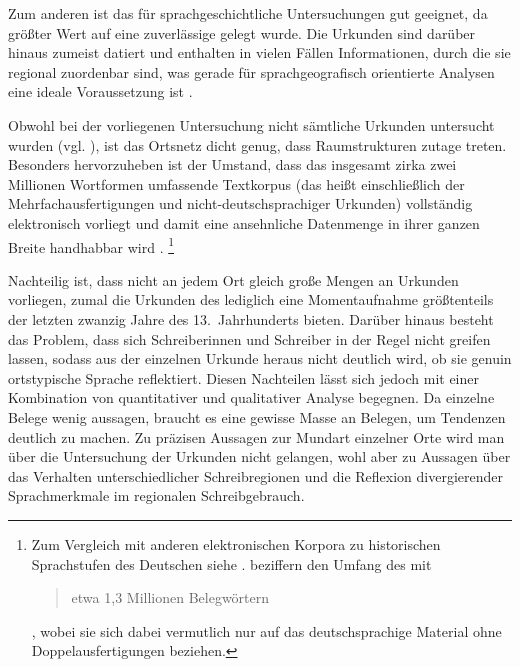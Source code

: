 Zum anderen ist das \CAO{} für sprachgeschichtliche
Untersuchungen gut geeignet, da größter Wert auf eine zuverlässige
 gelegt wurde. Die Urkunden sind darüber hinaus zumeist
datiert und enthalten in vielen Fällen Informationen, durch die sie regional
zuordenbar sind, was gerade für sprachgeografisch
orientierte Analysen eine ideale Voraussetzung ist
\autocites[7--8]{wmuovz}[Schreibortverzeichnis]{cao-online}[22]{schulze2011}.

Obwohl bei der vorliegenen Untersuchung nicht sämtliche Urkunden
untersucht wurden (vgl. ), ist das Ortsnetz dicht genug,
dass Raumstrukturen zutage treten. Besonders hervorzuheben
ist der Umstand, dass das insgesamt zirka zwei Millionen Wortformen umfassende
Textkorpus (das heißt einschließlich der Mehrfachausfertigungen und
nicht-deutschsprachiger Urkunden) vollständig elektronisch vorliegt
\autocites{gniffkerapp2005}{cao-online} und damit eine ansehnliche Datenmenge
in ihrer ganzen Breite handhabbar wird
\autocite{beckerschallert2021,beckerschallert2022b}.%
%
	\footnote{Zum Vergleich mit anderen elektronischen Korpora zu
	historischen Sprachstufen des Deutschen siehe
	\citet{dipper2015}. \citet[391]{gniffkerapp2005} beziffern den Umfang des
	\CAO{} mit \blockquote{etwa 1,3 Millionen Belegwörtern}, wobei sie sich
	dabei vermutlich nur auf das deutschsprachige Material ohne
	Doppelausfertigungen beziehen.} %

Nachteilig ist, dass nicht an jedem Ort gleich große Mengen an
Urkunden vorliegen, zumal die Urkunden des \CAO{} lediglich eine
Momentaufnahme größtenteils der letzten zwanzig Jahre des 13.~Jahrhunderts
bieten. Darüber hinaus besteht das Problem, dass sich Schreiberinnen und
Schreiber in der Regel nicht greifen lassen, sodass
aus der einzelnen Urkunde heraus nicht deutlich wird, ob sie genuin
ortstypische Sprache reflektiert. Diesen Nachteilen lässt sich jedoch mit einer
Kombination von quantitativer und qualitativer Analyse begegnen. Da einzelne
Belege wenig aussagen, braucht es eine gewisse Masse an Belegen, um Tendenzen
deutlich zu machen. Zu präzisen Aus\-sagen zur Mundart
einzelner Orte wird man über die Untersuchung der Urkunden nicht gelangen, wohl
aber zu Aussagen über das Verhalten unterschiedlicher Schreibregionen und die
Reflexion divergierender Sprachmerkmale im regionalen Schreibgebrauch.

